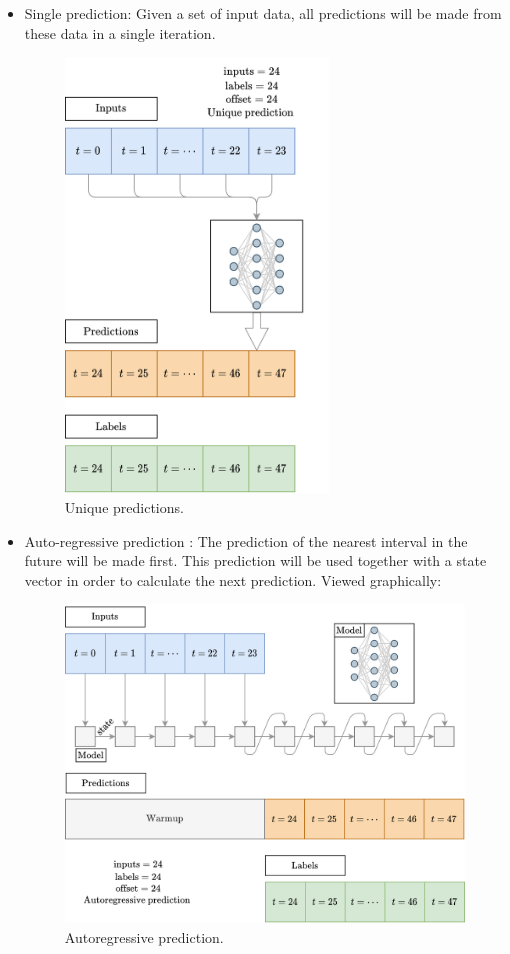 \begin{itemize}
    \item Single prediction: Given a set of input data, all predictions will be made from these data in a single iteration.
    
    \begin{figure}[H]
    \centering
    \includegraphics[width=7cm]{images/solution/modules/windows/windows-predictions-one-shot.png}
    \caption{Unique predictions.}
    \end{figure}

    \item Auto-regressive prediction \label{window_ar}: The prediction of the nearest interval in the future will be made first. This prediction will be used together with a state vector in order to calculate the next prediction. Viewed graphically:
    \begin{figure}[H]
    \centering
    \includegraphics[width=12cm]{images/solution/modules/windows/windows-predictions-ar.png}
    \caption{Autoregressive prediction.}
    \end{figure}
\end{itemize}

